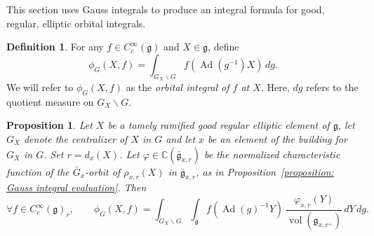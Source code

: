 \documentclass[11pt]{amsart}
\newtheorem{proposition}[theorem]{Proposition}
\theoremstyle{definition}
\newtheorem{definition}[theorem]{Definition}
\theoremstyle{remark}
\numberwithin{equation}{theorem}
\def\C{{\mathbb{C}}}
\def\GF{{G}}
\def\gF{{\mathfrak{g}}}
\def\orbint{{\phi}}
\newcommand{\Mf}{{\bar\GF}}
\newcommand{\mf}{{\bar\gF}}
\def\vphi{{\varphi}}
\def\Sch#1{{C^\infty_c(#1)}}
\def\Ad{{\rm Ad}}
\def\leftcoset{{\backslash}}
\def\vol{{\operatorname{vol}}}
\def\vol{\operatorname{vol}}
\def\Ad{\operatorname{Ad}}
\begin{document}
This section uses Gauss integrals to produce an integral formula
for good, regular, elliptic orbital integrals.

\begin{definition}\label{definition: orbital integral}
For any $f\in \Sch{\gF}$ and $X\in \gF$, define
\begin{equation}
\orbint_\GF(X,f) = \int_{\GF_X\leftcoset\GF}f(\Ad(g^{-1}) X)\, dg.
\end{equation}
We will refer to $\orbint_\GF(X,f)$ as the {\em orbital integral
of $f$ at $X$}. Here, $dg$ refers to the quotient measure on
${\GF_X\leftcoset\GF}$.
\end{definition}


\begin{proposition}\label{proposition: elliptic}
Let $X$ be a tamely ramified good regular elliptic element of
$\gF$, let $\GF_X$ denote the centralizer of $X$ in $\GF$ and let
$x$ be an element of the building for $\GF_X$ in $\GF$. Set $r =
d_x(X)$. Let $\vphi\in\C(\mf_{x,r})$ be the normalized
characteristic function of the $\Mf_x$-orbit of $\rho_{x,r}(X)$ in
$\mf_{x,r}$, as in Proposition~\ref{proposition: Gauss integral
evaluation}. Then
\begin{equation}
\forall f\in \Sch{\gF}_r,
\qquad \orbint_\GF(X,f) =
\int_{\GF_X\leftcoset\GF} \int_{\gF} f(\Ad(g)^{-1}Y)\
\frac{\vphi_{x,r}(Y)}{\vol(\gF_{x,r^+})} \, dY\, dg.
\end{equation}
\end{proposition}
\end{document}
